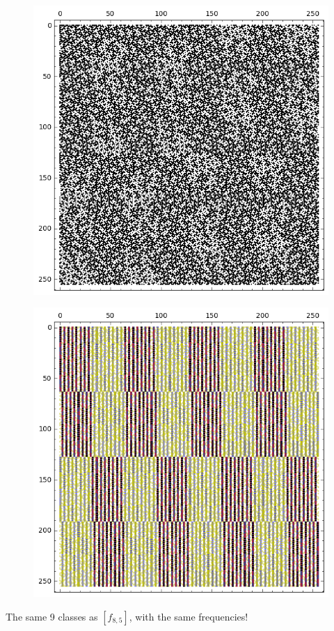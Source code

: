 \documentclass[12pt,a4paper]{article}
\begin{document}
\begin{figure}[!bhpt] %
\centering
\begin{minipage}{.48\textwidth}
  \centering
  \includegraphics[width=.9\linewidth]{../matrix_plot/re8_6_weight_class_matrix.png}
  \label{fig:8_6_weight_class_matrix}
\end{minipage}%
\begin{minipage}{.48\textwidth}
  \centering
  \includegraphics[width=.9\linewidth]{../matrix_plot/re8_6_bent_cayley_graph_index_matrix.png}
  \label{fig:8_6_bent_cayley_graph_index_matrix}
\end{minipage}
\end{figure}
The same 9 classes as $[f_{8,5}]$, with the same frequencies!
\end{document}
